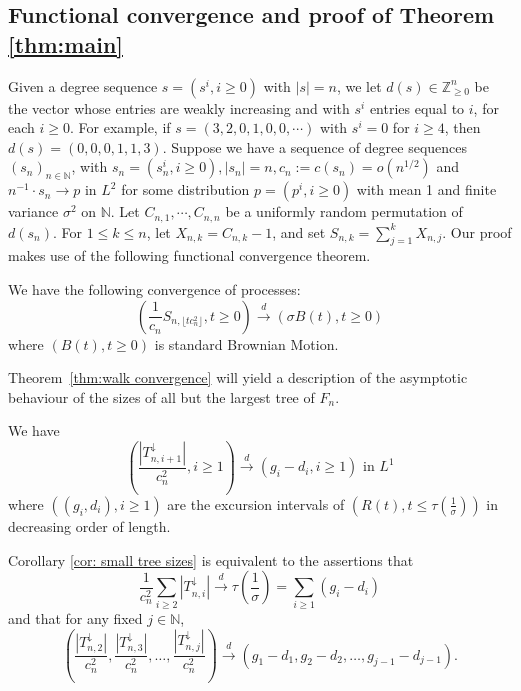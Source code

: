 \subsection{Functional convergence and proof of Theorem \ref{thm:main}}\label{sec:intro_key_ingredients}

Given a degree sequence $s=(s^i, i\ge 0)$ with $|s|=n$, we let $d(s)\in\mathbb{Z}^n_{\ge 0}$ be the vector whose entries are weakly increasing and with $s^i$ entries equal to $i$, for each $i\ge 0$. For example, if $s=(3, 2, 0, 1, 0,0, \cdots)$ with $s^i=0$ for $i\ge 4$, then $d(s)=(0, 0, 0, 1, 1, 3)$. Suppose we have a sequence of degree sequences $(s_n)_{n\in\mathbb{N}}$, with $s_n=(s^i_n, i\ge 0), |s_n|=n, c_n:=c(s_n)=o(n^{1/2})$ and $n^{-1}\cdot s_n\to p$ in $L^2$ for some distribution $p=(p^i, i\ge 0)$ with mean 1 and finite variance $\sigma^2$ on $\mathbb{N}$. Let $C_{n,1}, \cdots, C_{n,n}$ be a uniformly random permutation of $d(s_n)$. For $1\le k\le n$, let $X_{n,k}=C_{n,k}-1$, and set $S_{n,k}=\sum_{j=1}^k X_{n,j}$. Our proof makes use of the following functional convergence theorem. 
\begin{thm}\label{thm:walk convergence}
We have the following convergence of processes: 
\begin{equation}\label{eqn:walk convergence}
\left(\frac{1}{c_n}S_{n, \lfloor tc^2_n \rfloor}, t\ge 0 \right)\overset{d}{\to}\left(\sigma B(t), t\ge 0\right)
\end{equation}
where $(B(t), t\ge 0)$ is standard Brownian Motion.
\end{thm}
Theorem~\ref{thm:walk convergence} will yield a description of the asymptotic behaviour of the sizes of all but the largest tree of $F_n$. 
\begin{cor}\label{cor: small tree sizes}
We have \[\left(\frac{|T^\downarrow_{n,i+1}|}{c^2_n}, i\ge 1\right)\overset{d}{\to}\left(g_i-d_i, i\ge 1\right)\mbox{ in } L^1\] where $((g_i,d_i), i\ge 1)$ are the excursion intervals of $(R(t), t\le\tau(\frac{1}{\sigma}))$ in decreasing order of length.
\end{cor}
Corollary \ref{cor: small tree sizes} is equivalent to the assertions that
\begin{equation}\label{eqn:sum of small tree sizes}
\frac{1}{c^2_n}\sum\limits_{i\ge2}|T^\downarrow_{n,i}|\overset{d}{\to}\tau(\frac{1}{\sigma})=\sum\limits_{i\ge 1}(g_i-d_i)
\end{equation}
and that for any fixed $j\in\mathbb{N}$,
\begin{equation}\label{eqn:tree size convergence}
\left(\frac{|T^\downarrow_{n,2}|}{c^2_n},\frac{|T^\downarrow_{n,3}|}{c^2_n},\ldots, \frac{|T^\downarrow_{n,j}|}{c^2_n}\right)\overset{d}{\to} (g_1-d_1, g_2-d_2,\ldots, g_{j-1}-d_{j-1}).
\end{equation}

